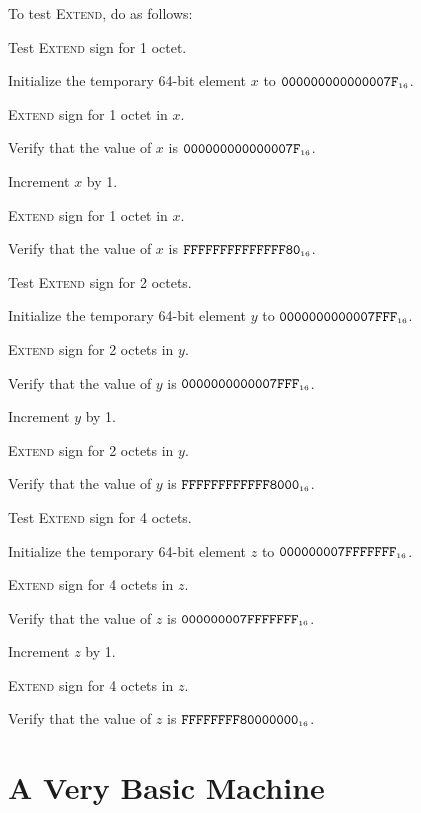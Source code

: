 \documentclass[a4paper,12pt]{article}
\newcommand{\num}[1]{\texttt{#1}}
\newcommand{\hex}[1]{\num{#1}_{\textup{\tiny 16}}}
\newcommand{\proc}[1]{\textsc{#1}}
\begin{document}
To test \proc{Extend}, do as follows:
\begin{stepletters}
\item Test \proc{Extend} sign for 1 octet.
  \begin{stepnumbers}
  \item Initialize the temporary 64-bit element $x$ to $\hex{000000000000007F}$.
  \item \proc{Extend} sign for 1 octet in $x$.
  \item Verify that the value of $x$ is $\hex{000000000000007F}$.
  \item Increment $x$ by 1.
  \item \proc{Extend} sign for 1 octet in $x$.
  \item Verify that the value of $x$ is $\hex{FFFFFFFFFFFFFF80}$.
  \end{stepnumbers}
\item Test \proc{Extend} sign for 2 octets.
  \begin{stepnumbers}
  \item Initialize the temporary 64-bit element $y$ to $\hex{0000000000007FFF}$.
  \item \proc{Extend} sign for 2 octets in $y$.
  \item Verify that the value of $y$ is $\hex{0000000000007FFF}$.
  \item Increment $y$ by 1.
  \item \proc{Extend} sign for 2 octets in $y$.
  \item Verify that the value of $y$ is $\hex{FFFFFFFFFFFF8000}$.
  \end{stepnumbers}
\item Test \proc{Extend} sign for 4 octets.
  \begin{stepnumbers}
  \item Initialize the temporary 64-bit element $z$ to $\hex{000000007FFFFFFF}$.
  \item \proc{Extend} sign for 4 octets in $z$.
  \item Verify that the value of $z$ is $\hex{000000007FFFFFFF}$.
  \item Increment $z$ by 1.
  \item \proc{Extend} sign for 4 octets in $z$.
  \item Verify that the value of $z$ is $\hex{FFFFFFFF80000000}$.
  \end{stepnumbers}
\end{stepletters}

\section{A Very Basic Machine}
\end{document}
